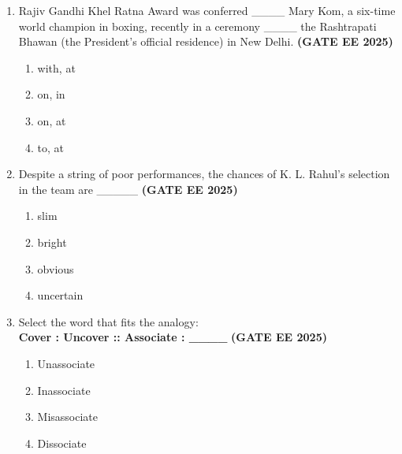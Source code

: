 \documentclass[journal,12pt,onecolumn]{IEEEtran}
\theoremstyle{remark}
\begin{document}
\begin{enumerate}

\item Rajiv Gandhi Khel Ratna Award was conferred \_\_\_\_ Mary Kom, a six-time world 
champion in boxing, recently in a ceremony \_\_\_\_ the Rashtrapati Bhawan (the President's 
official residence) in New Delhi. \hfill \textbf{(GATE EE 2025)}

\begin{enumerate}
\item with, at 
\item on, in 
\item on, at 
\item to, at
\end{enumerate}


\item Despite a string of poor performances, the chances of K. L. Rahul's selection in the team are 
\_\_\_\_\_ \hfill \textbf{(GATE EE 2025)}
\begin{enumerate}
\item slim 
\item bright 
\item obvious 
\item uncertain
\end{enumerate}


\item Select the word that fits the analogy: \\ 
\textbf{Cover : Uncover :: Associate : \_\_\_\_} \hfill \textbf{(GATE EE 2025)}

\begin{enumerate}
\item Unassociate 
\item Inassociate 
\item Misassociate 
\item Dissociate
\end{enumerate}


\end{enumerate}
\end{document}
